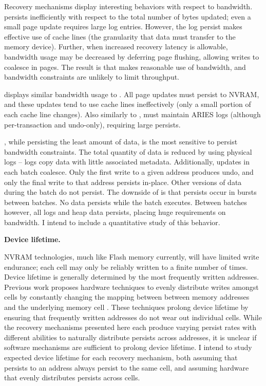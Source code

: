 Recovery mechanisms display interesting behaviors with respect to bandwidth.
\NVDisk persists inefficiently with respect to the total number of bytes updated; even a small page update requires large log entries.
However, the log persist makes effective use of cache lines (the granularity that data must transfer to the memory device).
Further, when increased recovery latency is allowable, bandwidth usage may be decreased by deferring page flushing, allowing writes to coalesce in pages.
The result is that \NVDisk makes reasonable use of bandwidth, and bandwidth constraints are unlikely to limit throughput.

\InPlace displays similar bandwidth usage to \NVDisk.
All page updates must persist to NVRAM, and these updates tend to use cache lines ineffectively (only a small portion of each cache line changes).
Also similarly to \NVDisk, \InPlace must maintain ARIES logs (although per-transaction and undo-only), requiring large persists.

\GroupCommit, while persisting the least amount of data, is the most sensitive to persist bandwidth constraints.
The total quantity of data is reduced by using physical logs -- logs copy data with little associated metadata.
Additionally, updates in each batch coalesce.
Only the first write to a given address produces undo, and only the final write to that address persists in-place.
Other versions of data during the batch do not persist.
The downside of \GroupCommit is that persists occur in bursts between batches.
No data persists while the batch executes.
Between batches however, all logs and heap data persists, placing huge requirements on bandwidth.
I intend to include a quantitative study of this behavior.

\textbf{Device lifetime.}

NVRAM technologies, much like Flash memory currently, will have limited write endurance; each cell may only be reliably written to a finite number of times.
Device lifetime is generally determined by the most frequently written addresses.
Previous work proposes hardware techniques to evenly distribute writes amongst cells by constantly changing the mapping between between memory addresses and the underlying memory cell \cite{QureshiKaridis09}.
These techniques prolong device lifetime by ensuring that frequently written addresses do not wear out individual cells.
While the recovery mechanisms presented here each produce varying persist rates with different abilities to naturally distribute persists across addresses, it is unclear if software mechanisms are sufficient to prolong device lifetime.
I intend to study expected device lifetime for each recovery mechanism, both assuming that persists to an address always persist to the same cell, and assuming hardware that evenly distributes persists across cells.

